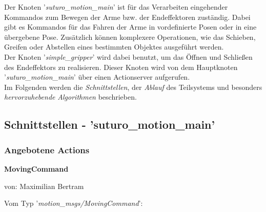 \documentclass{suturo}
\makeatletter
\newcommand{\chapterauthor}[1]{%
  {\parindent0pt\vspace*{-27pt}%
  \linespread{0}\small\begin{flushright}von: #1\end{flushright}%
  \par\nobreak\vspace*{0pt}}
  \@afterheading%
}
\makeatother
\begin{document}
\begin{figure}[!htb]
\end{figure}

Der Knoten '\textit{suturo\_motion\_main}' ist für das Verarbeiten eingehender Kommandos zum Bewegen der Arme bzw. der Endeffektoren zuständig. Dabei gibt es Kommandos für das Fahren der Arme in vordefinierte Posen oder in eine übergebene Pose. Zusätzlich können komplexere Operationen, wie das Schieben, Greifen oder Abstellen eines bestimmten Objektes ausgeführt werden.\\
Der Knoten '\textit{simple\_gripper}' wird dabei benutzt, um das Öffnen und Schließen des Endeffektors zu realisieren. Dieser Knoten wird von dem Hauptknoten '\textit{suturo\_motion\_main}' über einen Actionserver aufgerufen.\\

Im Folgenden werden die \textit{Schnittstellen}, der \textit{Ablauf} des Teilsystems und besonders \textit{hervorzuhebende} \textit{Algorithmen} beschrieben.\\

\newpage

\subsection{Schnittstellen - 'suturo\_motion\_main'}
\subsubsection{Angebotene Actions}
\textbf{MovingCommand}
\chapterauthor{Maximilian Bertram}
Vom Typ '\textit{motion\_msgs/MovingCommand}': \\
\end{document}
